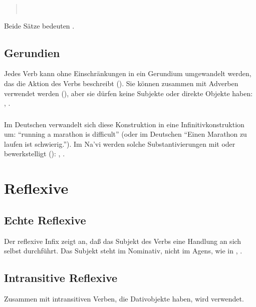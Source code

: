 \begin{quotation}
\noindent{}\\
\noindent{}
\end{quotation}

\noindent Beide S\"atze bedeuten .

\subsection{Gerundien} Jedes Verb kann ohne Einschr\"ankungen in ein Gerundium umgewandelt
werden, das die Aktion des Verbs beschreibt (). Sie k\"onnen
zusammen mit Adverben verwendet werden (), aber sie d\"urfen
keine Subjekte oder direkte Objekte haben: , .\label{syn:gerund}

\subsubsection{} Im Deutschen verwandelt sich diese Konstruktion in eine
Infinitivkonstruktion um: "`running a marathon is difficult"' (oder
im Deutschen "`Einen Marathon zu laufen ist schwierig."'). Im Na'vi werden solche
Substantivierungen mit  oder  bewerkstelligt ():
, .


\section{Reflexive}
\subsection{Echte Reflexive} 
Der reflexive Infix  zeigt an, da\ss{} das Subjekt des Verbs eine Handlung
an sich selbst durchf\"uhrt. Das Subjekt steht im Nominativ, nicht im Agens, wie in
, .

\subsection{Intransitive Reflexive} Zusammen mit intransitiven Verben, die Dativobjekte
haben, wird  verwendet.

